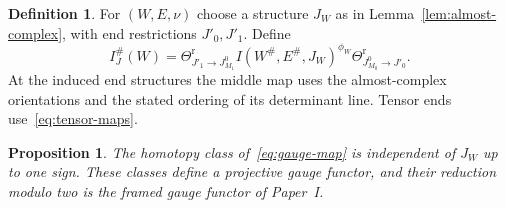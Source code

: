 \documentclass[11pt]{amsart}
\newtheorem{proposition}[theorem]{Proposition}
\theoremstyle{definition}
\newtheorem{definition}[theorem]{Definition}
\theoremstyle{remark}
\theoremstyle{plain}
\numberwithin{equation}{section}
\newcommand{\IG}{I^{\#}_{J}}
\begin{document}
\begin{definition}\label{def:gauge-map}
For $(W,E,\nu)$ choose a structure $J_W$ as in Lemma~\ref{lem:almost-complex}, with end
restrictions $J'_0,J'_1$. Define
\begin{equation}\label{eq:gauge-map}
 \IG(W)=\Theta^{\mathrm r}_{J'_1\to J^0_{M_1}}
        I(W^\#,E^\#,J_W)^{\phi_W}
        \Theta^{\mathrm r}_{J^0_{M_0}\to J'_0}.
\end{equation}
At the induced end structures the middle map uses the
almost-complex orientations and the stated ordering of its
determinant line. Tensor ends use~\eqref{eq:tensor-maps}.
\end{definition}

\begin{proposition}\label{prop:gauge-functor}
The homotopy class of~\eqref{eq:gauge-map} is independent of
$J_W$ up to one sign. These classes define a projective gauge
functor, and their reduction modulo two is the framed gauge
functor of Paper~I.
\end{proposition}
\end{document}
